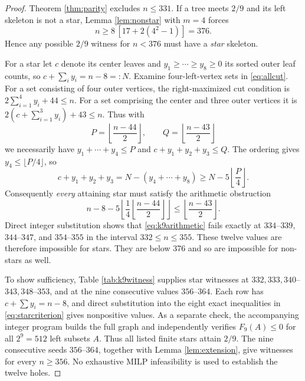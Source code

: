 \documentclass[11pt,a4paper]{article}
\begin{document}
\begin{proof}
Theorem \ref{thm:parity} excludes $n\le331$. If a tree meets $2/9$ and its left skeleton is not a star, Lemma \ref{lem:nonstar} with $m=4$ forces
\[
n\ge8\,[17+2(4^2-1)]=376.
\]
Hence any possible $2/9$ witness for $n<376$ must have a \emph{star} skeleton.

For a star let $c$ denote its center leaves and $y_1\ge\cdots\ge y_8\ge0$ its sorted outer leaf counts, so
$c+\sum_i y_i=n-8=:N$. Examine four-left-vertex sets in \eqref{eq:allcut}. For a set consisting of four outer vertices, the right-maximized cut condition is $2\sum_{i=1}^{4}y_i+44\le n$. For a set comprising the center and three outer vertices it is $2(c+\sum_{i=1}^3y_i)+43\le n$. Thus with
\[
P=\left\lfloor\frac{n-44}{2}\right\rfloor,\qquad
Q=\left\lfloor\frac{n-43}{2}\right\rfloor
\]
we necessarily have $y_1+\cdots+y_4\le P$ and $c+y_1+y_2+y_3\le Q$. The ordering gives $y_4\le\lfloor P/4\rfloor$, so
\[
 c+y_1+y_2+y_3 =N-(y_4+\cdots+y_8)
 \ge N-5\left\lfloor\frac P4\right\rfloor.
\]
Consequently \emph{every} attaining star must satisfy the arithmetic obstruction
\begin{equation}\label{eq:k9arithmetic}
n-8-5\left\lfloor\frac14\left\lfloor\frac{n-44}{2}\right\rfloor\right\rfloor
\le\left\lfloor\frac{n-43}{2}\right\rfloor.
\end{equation}
Direct integer substitution shows that \eqref{eq:k9arithmetic} fails exactly at $334$--$339$, $344$--$347$, and $354$--$355$ in the interval $332\le n\le355$. These twelve values are therefore impossible for stars. They are below 376 and so are impossible for non-stars as well.

To show sufficiency, Table \ref{tab:k9witness} supplies star witnesses at $332,333,340$--$343,348$--$353$, and at the nine consecutive values $356$--$364$. Each row has $c+\sum y_i=n-8$, and direct substitution into the eight exact inequalities in \eqref{eq:starcriterion} gives nonpositive values. As a separate check, the accompanying integer program builds the full graph and independently verifies $F_9(A)\le0$ for all $2^9=512$ left subsets $A$. Thus all listed finite stars attain $2/9$. The nine consecutive seeds $356$--$364$, together with Lemma \ref{lem:extension}, give witnesses for every $n\ge356$. No exhaustive MILP infeasibility is used to establish the twelve holes.\end{proof}
\end{document}
